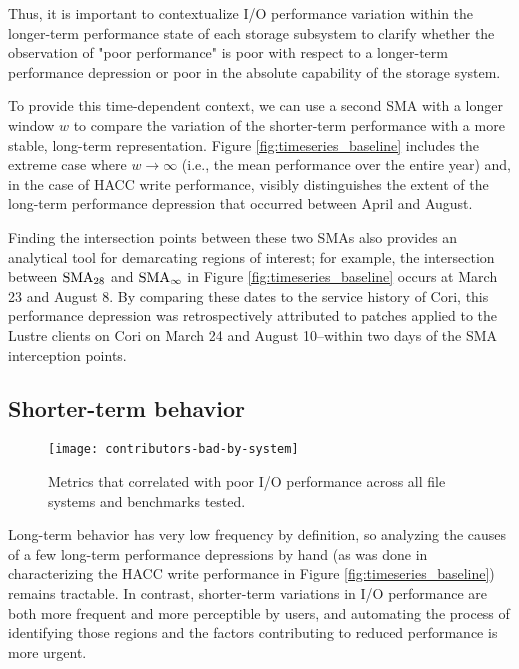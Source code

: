 Thus, it is important to contextualize I/O performance variation within the longer-term performance state of each storage subsystem to clarify whether the observation of "poor performance" is poor with respect to a longer-term performance depression or poor in the absolute capability of the storage system.

To provide this time-dependent context, we can use a second SMA with a longer window $w$ to compare the variation of the shorter-term performance with a more stable, long-term representation.  Figure \ref{fig:timeseries_baseline} includes the extreme case where ${w \rightarrow \infty}$ (i.e., the mean performance over the entire year) and, in the case of HACC write performance, visibly distinguishes the extent of the long-term performance depression that occurred between April and August.

Finding the intersection points between these two SMAs also provides an analytical tool for demarcating regions of interest;
for example, the intersection between $\textup{SMA}_{28}$ and $\textup{SMA}_\infty$ in Figure \ref{fig:timeseries_baseline} occurs at March 23 and August 8.
By comparing these dates to the service history of Cori, this performance depression was retrospectively attributed to patches applied to the Lustre clients on Cori on March 24 and August 10--within two days of the SMA interception points.

\subsection{Shorter-term behavior} \label{sec:features/shortterm}

\begin{figure}[t]
    \centering
    \texttt{[image: contributors-bad-by-system]}
    \vspace{-.35in}
    \caption{Metrics that correlated with poor I/O performance across all file systems and benchmarks tested.}
    \label{fig:contributors-bad-by-system}
\end{figure}


Long-term behavior has very low frequency by definition, so analyzing the causes of a few long-term performance depressions by hand (as was done in characterizing the HACC write performance in Figure \ref{fig:timeseries_baseline}) remains tractable.
In contrast, shorter-term variations in I/O performance are both more frequent and more perceptible by users, and automating the process of identifying those regions and the factors contributing to reduced performance is more urgent.

